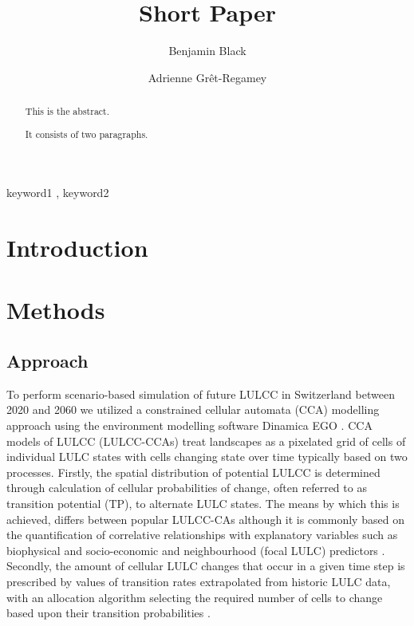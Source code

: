 \documentclass[preprint, 3p, authoryear]{elsarticle} %
\begin{document}
\begin{frontmatter}

  \title{Short Paper}
    \author[ETH Zürich]{Benjamin Black%
  }
    \author[ETH Zürich]{Adrienne Grêt-Regamey%
  }

  \begin{abstract}
  This is the abstract.

  It consists of two paragraphs.
  \end{abstract}
    \begin{keyword}
    keyword1 \sep
    keyword2
  \end{keyword}

 \end{frontmatter}

\hypertarget{introduction}{%
\section{Introduction}\label{introduction}}

\hypertarget{methods}{%
\section{Methods}\label{methods}}

\hypertarget{approach}{%
\subsection{Approach}\label{approach}}

To perform scenario-based simulation of future LULCC in Switzerland between 2020 and 2060 we utilized a constrained cellular automata (CCA) modelling approach using the environment modelling software Dinamica EGO . CCA models of LULCC (LULCC-CCAs) treat landscapes as a pixelated grid of cells of individual LULC states with cells changing state over time typically based on two processes. Firstly, the spatial distribution of potential LULCC is determined through calculation of cellular probabilities of change, often referred to as transition potential (TP), to alternate LULC states. The means by which this is achieved, differs between popular LULCC-CAs although it is commonly based on the quantification of correlative relationships with explanatory variables such as biophysical and socio-economic and neighbourhood (focal LULC) predictors . Secondly, the amount of cellular LULC changes that occur in a given time step is prescribed by values of transition rates extrapolated from historic LULC data, with an allocation algorithm selecting the required number of cells to change based upon their transition probabilities .
\end{document}
